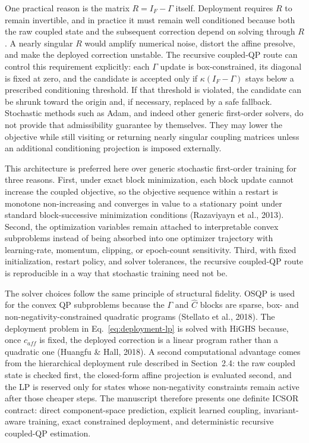 \documentclass[a4paper,fleqn]{cas-sc}
\newenvironment{revblock}{\begingroup\color{revDefault}}{\endgroup}
\newenvironment{revblockr127}{\begingroup\color{revRoneTwentySeven}}{\endgroup}
\begin{document}
\begin{revblock}
\begin{revblockr127}
One practical reason is the matrix $R = I_F - \Gamma$ itself. Deployment requires $R$ to remain invertible, and in practice it must remain well conditioned because both the raw coupled state and the subsequent correction depend on solving through $R$. A nearly singular $R$ would amplify numerical noise, distort the affine presolve, and make the deployed correction unstable. The recursive coupled-QP route can control this requirement explicitly: each $\Gamma$ update is box-constrained, its diagonal is fixed at zero, and the candidate is accepted only if $\kappa(I_F - \Gamma)$ stays below a prescribed conditioning threshold. If that threshold is violated, the candidate can be shrunk toward the origin and, if necessary, replaced by a safe fallback. Stochastic methods such as Adam, and indeed other generic first-order solvers, do not provide that admissibility guarantee by themselves. They may lower the objective while still visiting or returning nearly singular coupling matrices unless an additional conditioning projection is imposed externally.

This architecture is preferred here over generic stochastic first-order training for three reasons. First, under exact block minimization, each block update cannot increase the coupled objective, so the objective sequence within a restart is monotone non-increasing and converges in value to a stationary point under standard block-successive minimization conditions (Razaviyayn et al., 2013). Second, the optimization variables remain attached to interpretable convex subproblems instead of being absorbed into one optimizer trajectory with learning-rate, momentum, clipping, or epoch-count sensitivity. Third, with fixed initialization, restart policy, and solver tolerances, the recursive coupled-QP route is reproducible in a way that stochastic training need not be.

The solver choices follow the same principle of structural fidelity. OSQP is used for the convex QP subproblems because the $\Gamma$ and $\widehat{C}$ blocks are sparse, box- and non-negativity-constrained quadratic programs (Stellato et al., 2018). The deployment problem in Eq.~\eqref{eq:deployment-lp} is solved with HiGHS because, once $c_{aff}$ is fixed, the deployed correction is a linear program rather than a quadratic one (Huangfu \& Hall, 2018). A second computational advantage comes from the hierarchical deployment rule described in Section~2.4: the raw coupled state is checked first, the closed-form affine projection is evaluated second, and the LP is reserved only for states whose non-negativity constraints remain active after those cheaper steps. The manuscript therefore presents one definite ICSOR contract: direct component-space prediction, explicit learned coupling, invariant-aware training, exact constrained deployment, and deterministic recursive coupled-QP estimation.


\end{revblockr127}
\end{revblock}
\end{document}
